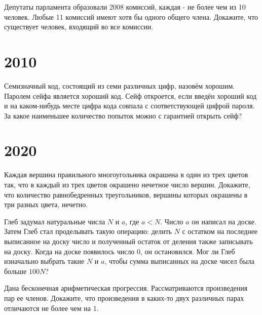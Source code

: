 \documentclass[11pt, a4paper]{template}
\begin{document}
\begin{exercise}[M2096]
Депутаты парламента образовали 2008 комиссий, каждая - не более чем из 10 человек. Любые 11 комиссий имеют хотя бы одного общего члена. Докажите, что существует человек, входящий во все комиссии.
\end{exercise}



\chapter{2010}

\begin{exercise}[M2162]
Семизначный код, состоящий из семи различных цифр, назовём хорошим. Паролем сейфа является хороший код. Сейф откроется, если введён хороший код и на каком-нибудь месте цифра кода совпала с соответствующей цифрой пароля. За какое наименьшее количество попыток можно с гарантией открыть сейф?
\end{exercise}

\chapter{2020}

\begin{exercise}[M2593]
Каждая вершина правильного многоугольника окрашена в один из трех цветов так, что в каждый из трех цветов окрашено нечетное число вершин. Докажите, что количество равнобедренных треугольников, вершины которых окрашены в три разных цвета, нечетно.
\end{exercise}

\begin{exercise}[M2601]
Глеб задумал натуральные числа $N$ и $a$, где $a < N$. Число $a$ он написал на доске. Затем Глеб стал проделывать такую операцию: делить $N$ с остатком на последнее выписанное на доску число и полученный остаток от деления также записывать на доску. Когда на доске
появилось число 0, он остановился. Мог ли Глеб изначально выбрать такие $N$ и $a$,
чтобы сумма выписанных на доске чисел была больше $100N$?
\end{exercise}

\begin{exercise}[2627]
Дана бесконечная арифметическая прогрессия. Рассматриваются произведения пар ее членов. Докажите, что произведения в каких-то двух различных парах отличаются не более чем на 1.
\end{exercise}
\end{document}
